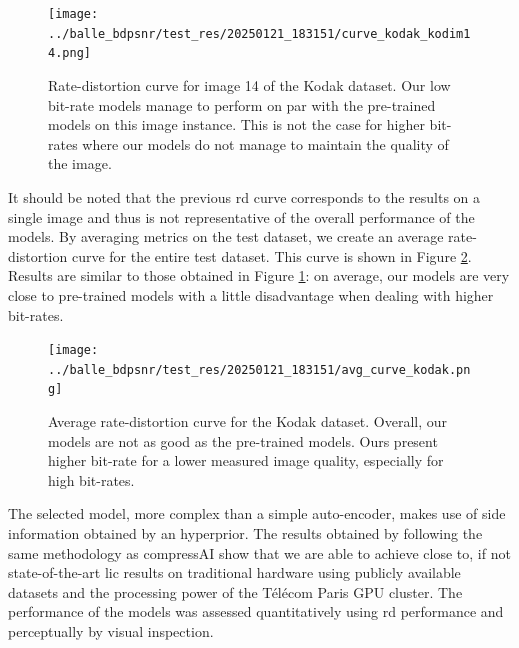 \begin{figure}
    \centering
    \texttt{[image: ../balle\_bdpsnr/test\_res/20250121\_183151/curve\_kodak\_kodim14.png]}
    \caption[Rate-distortion curve for image 14 of the Kodak dataset.]{Rate-distortion curve for image 14 of the Kodak dataset. Our low bit-rate models manage to perform on par with the pre-trained models on this image instance. This is not the case for higher bit-rates where our models do not manage to maintain the quality of the image.}
    \label{bdpsnr_2}
\end{figure}

It should be noted that the previous \acrshort{rd} curve corresponds to the results on a single image and thus is not representative of the overall performance of the models. By averaging metrics on the test dataset, we create an average rate-distortion curve for the entire test dataset. This curve is shown in Figure \ref{bdpsnr_3}. Results are similar to those obtained in Figure \ref{bdpsnr_2}: on average, our models are very close to pre-trained models with a little disadvantage when dealing with higher bit-rates.

\begin{figure}
    \centering
    \texttt{[image: ../balle\_bdpsnr/test\_res/20250121\_183151/avg\_curve\_kodak.png]}
    \caption[Average rate-distortion curve for the Kodak dataset.]{Average rate-distortion curve for the Kodak dataset. Overall, our models are not as good as the pre-trained models. Ours present higher bit-rate for a lower measured image quality, especially for high bit-rates.}
    \label{bdpsnr_3}
\end{figure}

The selected model, more complex than a simple auto-encoder, makes use of side information obtained by an hyperprior. The results obtained by following the same methodology as compressAI show that we are able to achieve close to, if not state-of-the-art \acrshort{lic} results on traditional hardware using publicly available datasets and the processing power of the Télécom Paris GPU cluster. The performance of the models was assessed quantitatively using \acrshort{rd} performance and perceptually by visual inspection.
